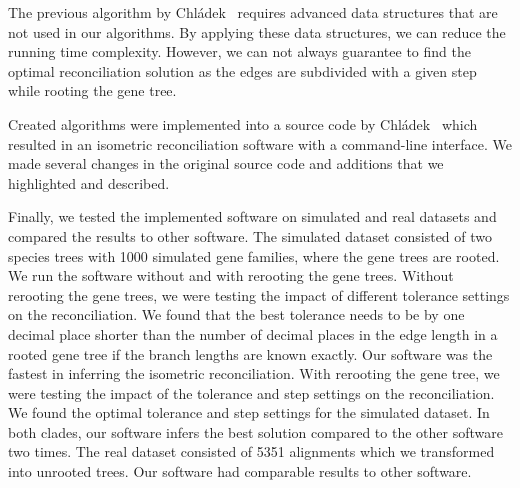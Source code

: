 The previous algorithm by Chládek~\cite{chladek_thesis} requires advanced data structures that are not used in our algorithms. By applying these data structures, we can reduce the running time complexity. However, we can not always guarantee to find the optimal reconciliation solution as the edges are subdivided with a given step while rooting the gene tree.

Created algorithms were implemented into a source code by Chládek~\cite{chladek_thesis} which resulted in an isometric reconciliation software with a command-line interface. We made several changes in the original source code and additions that we highlighted and described.

Finally, we tested the implemented software on simulated and real datasets and compared the results to other software. The simulated dataset consisted of two species trees with 1000 simulated gene families, where the gene trees are rooted. We run the software without and with rerooting the gene trees. Without rerooting the gene trees, we were testing the impact of different tolerance settings on the reconciliation. We found that the best tolerance needs to be by one decimal place shorter than the number of decimal places in the edge length in a rooted gene tree if the branch lengths are known exactly. Our software was the fastest in inferring the isometric reconciliation. With rerooting the gene tree, we were testing the impact of the tolerance and step settings on the reconciliation. We found the optimal tolerance and step settings for the simulated dataset. In both clades, our software infers the best solution compared to the other software two times. The real dataset consisted of 5351 alignments which we transformed into unrooted trees. Our software had comparable results to other software.
